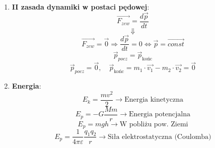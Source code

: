 \documentclass{article}
\begin{document}
\begin{enumerate}
		\item \textbf{II zasada dynamiki w postaci pędowej}:
		\[
		\overrightarrow{F_{zew}} = \frac{d \vec{p}}{dt}
		\]
		\[
		\Downarrow
		\]
		\[
		\overrightarrow{F_{zew}} = \vec{0} \Rightarrow \frac{d \vec{p}}{dt} = 0 \Leftrightarrow \vec{p} = \overrightarrow{const}
		\]
		\[
		\vec{p}_{pocz} = \vec{p}_{\text{końc}}
		\]
		\[
		\vec{p}_{pocz} = \vec{0}, \quad \vec{p}_{\text{końc}}= m_1 \cdotp \overrightarrow{v_1} - m_2 \cdotp \overrightarrow{v_2} = \vec{0}
		\]
		
		\item \textbf{Energia}:
		\[
		E_k = \frac{mv^2}{2} \longrightarrow \text{Energia kinetyczna}
		\]
		\[
		E_p = -G \frac{Mm}{r} \longrightarrow \text{Energia potencjalna}
		\]
		\[
		E_p = mgh \longrightarrow \text{W pobliżu pow. Ziemi}
		\]
		\[
		E_p = \frac{1}{4 \pi \varepsilon} \frac{q_1 q_2}{r} \longrightarrow \text{Siła elektrostatyczna (Coulomba)}
		\]
		
		
	\end{enumerate}
	
\end{document}
